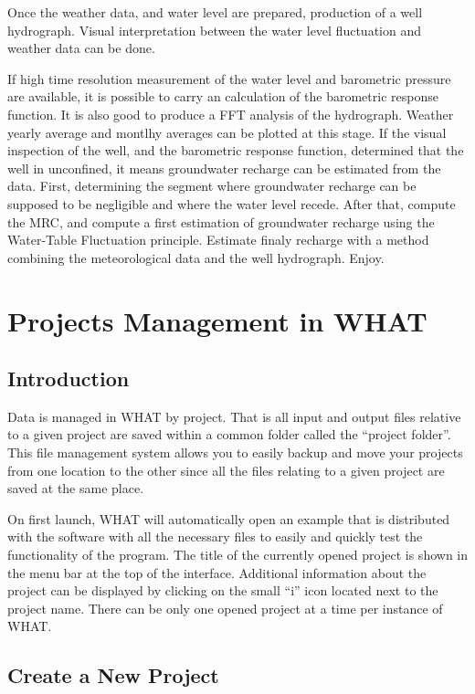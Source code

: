 \documentclass[12pt, letterpaper, fleqn]{report}
\begin{document}
Once the weather data, and water level are prepared, production of a well hydrograph. Visual interpretation between the water level  fluctuation and weather data can be done.

If high time resolution measurement of the water level and barometric pressure are available, it is possible to carry an calculation of the barometric response function. It is also good to produce a FFT analysis of the hydrograph.
Weather yearly average and montlhy averages can be plotted at this stage.
If the visual inspection of the well, and the barometric response function, determined that the well in unconfined, it means groundwater recharge can be estimated from the data. First, determining the segment where groundwater recharge can be supposed to be negligible and where the water level recede. After that, compute the MRC, and compute a first estimation of groundwater recharge using the Water-Table Fluctuation principle. Estimate finaly recharge with a method combining the meteorological data and the well hydrograph. Enjoy.

\section{Projects Management in WHAT}

\subsection{Introduction}

Data is managed in WHAT by project. That is all input and output files relative to a given project are saved within a common folder called the ``project folder''. This file management system allows you to easily backup and move your projects from one location to the other since all the files relating to a given project are saved at the same place. 

On first launch, WHAT will automatically open an example that is distributed with the software with all the necessary files to easily and quickly test the functionality of the program. The title of the currently opened project is shown in the menu bar at the top of the interface. Additional information about the project can be displayed by clicking on the small ``i'' icon located next to the project name. There can be only one opened project at a time per instance of WHAT. 

\subsection{Create a New Project}
\end{document}
